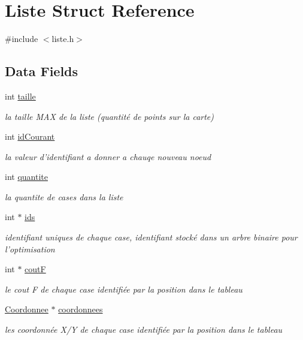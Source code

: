 \hypertarget{struct_liste}{\section{Liste Struct Reference}
\label{struct_liste}
}


{\ttfamily \#include $<$liste.\-h$>$}

\subsection*{Data Fields}
\begin{DoxyCompactItemize}
\item 
int \hyperlink{struct_liste_a29bf3fc0ffe4e72e45f0c84ab4f8cd1e}{taille}
\begin{DoxyCompactList}\small\item\em la taille M\-A\-X de la liste (quantité de points sur la carte) \end{DoxyCompactList}\item 
int \hyperlink{struct_liste_a854832481703f0bfbc8937240f580f84}{id\-Courant}
\begin{DoxyCompactList}\small\item\em la valeur d'identifiant a donner a chauqe nouveau noeud \end{DoxyCompactList}\item 
int \hyperlink{struct_liste_a94d4d4dd15d5aa428d2b1589e6f264d4}{quantite}
\begin{DoxyCompactList}\small\item\em la quantite de cases dans la liste \end{DoxyCompactList}\item 
int $\ast$ \hyperlink{struct_liste_a6081d5fc46a8899b4beb60b0df7dd190}{ids}
\begin{DoxyCompactList}\small\item\em identifiant uniques de chaque case, identifiant stocké dans un arbre binaire pour l'optimisation \end{DoxyCompactList}\item 
int $\ast$ \hyperlink{struct_liste_ad648f067f3cc86c9b8f8222e2014ad26}{cout\-F}
\begin{DoxyCompactList}\small\item\em le cout F de chaque case identifiée par la position dans le tableau \end{DoxyCompactList}\item 
\hyperlink{struct_coordonnee}{Coordonnee} $\ast$ \hyperlink{struct_liste_a6b0177fa630b778a8f03f1a9ef2411b6}{coordonnees}
\begin{DoxyCompactList}\small\item\em les coordonnée X/\-Y de chaque case identifiée par la position dans le tableau \end{DoxyCompactList}\end{DoxyCompactItemize}


